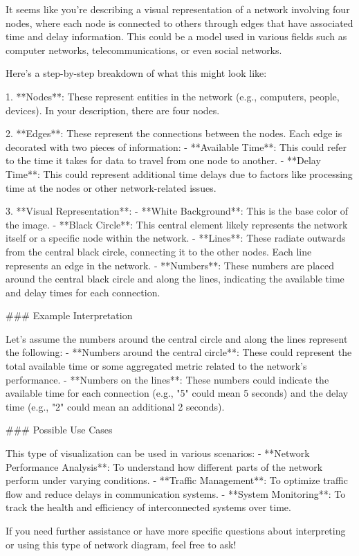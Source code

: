 It seems like you're describing a visual representation of a network involving four nodes, where each node is connected to others through edges that have associated time and delay information. This could be a model used in various fields such as computer networks, telecommunications, or even social networks.

Here's a step-by-step breakdown of what this might look like:

1. **Nodes**: These represent entities in the network (e.g., computers, people, devices). In your description, there are four nodes.

2. **Edges**: These represent the connections between the nodes. Each edge is decorated with two pieces of information:
   - **Available Time**: This could refer to the time it takes for data to travel from one node to another.
   - **Delay Time**: This could represent additional time delays due to factors like processing time at the nodes or other network-related issues.

3. **Visual Representation**:
   - **White Background**: This is the base color of the image.
   - **Black Circle**: This central element likely represents the network itself or a specific node within the network.
   - **Lines**: These radiate outwards from the central black circle, connecting it to the other nodes. Each line represents an edge in the network.
   - **Numbers**: These numbers are placed around the central black circle and along the lines, indicating the available time and delay times for each connection.

### Example Interpretation

Let's assume the numbers around the central circle and along the lines represent the following:
- **Numbers around the central circle**: These could represent the total available time or some aggregated metric related to the network's performance.
- **Numbers on the lines**: These numbers could indicate the available time for each connection (e.g., "5" could mean 5 seconds) and the delay time (e.g., "2" could mean an additional 2 seconds).

### Possible Use Cases

This type of visualization can be used in various scenarios:
- **Network Performance Analysis**: To understand how different parts of the network perform under varying conditions.
- **Traffic Management**: To optimize traffic flow and reduce delays in communication systems.
- **System Monitoring**: To track the health and efficiency of interconnected systems over time.

If you need further assistance or have more specific questions about interpreting or using this type of network diagram, feel free to ask!